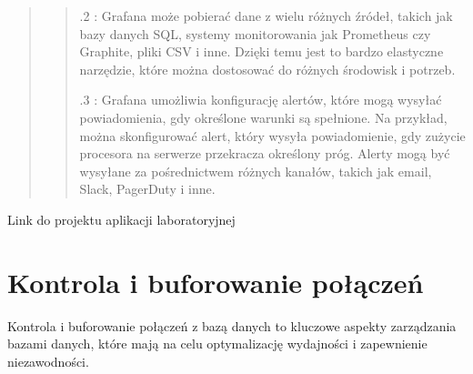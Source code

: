\documentclass[letterpaper,10pt,polish]{sphinxmanual}
\begin{document}
\begin{enumerate}
\begin{quote}
\begin{quote}
.2 : Grafana może pobierać dane z wielu różnych źródeł, takich jak bazy danych SQL, systemy monitorowania jak Prometheus czy Graphite, pliki CSV i inne. Dzięki temu jest to bardzo elastyczne narzędzie, które można dostosować do różnych środowisk i potrzeb.

.3 : Grafana umożliwia konfigurację alertów, które mogą wysyłać powiadomienia, gdy określone warunki są spełnione. Na przykład, można skonfigurować alert, który wysyła powiadomienie, gdy zużycie procesora na serwerze przekracza określony próg. Alerty mogą być wysyłane za pośrednictwem różnych kanałów, takich jak e\sphinxhyphen{}mail, Slack, PagerDuty i inne.
\end{quote}
\end{quote}

\end{enumerate}

\sphinxstepscope

\sphinxAtStartPar
{} \sphinxhyphen{} Link do projektu aplikacji laboratoryjnej


\chapter{Kontrola i buforowanie połączeń}
\label{\detokenize{rozdzialy/rozdzial1:kontrola-i-buforowanie-polaczen}}\label{\detokenize{rozdzialy/rozdzial1::doc}}
\sphinxAtStartPar
Kontrola i buforowanie połączeń z bazą danych to kluczowe aspekty zarządzania bazami danych, które mają na celu optymalizację wydajności i zapewnienie niezawodności.
\end{document}
